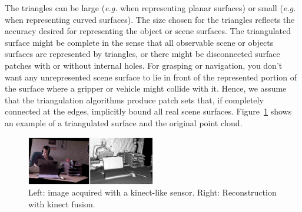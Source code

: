 \documentclass[twocolumn,oneside]{book}
\begin{document}
\begin{itemize}
  The triangles can be large ({\it e.g.} when representing planar
  surfaces) or small ({\it e.g.} when representing curved surfaces).
  The size chosen for the triangles reflects the accuracy desired for
  representing the object or scene surfaces.  The triangulated surface
  might be complete in the sense that all observable scene or objects
  surfaces are represented by triangles, or there might be
  disconnected surface patches with or without internal holes.  For
  grasping or navigation, you don't want any unrepresented scene
  surface to lie in front of the represented portion of the surface
  where a gripper or vehicle might collide with it.  Hence, we assume
  that the triangulation algorithms produce patch sets that, if
  completely connected at the edges, implicitly bound all real scene
  surfaces. Figure~\ref{timmesh} shows an example of a triangulated
  surface and the original point cloud.
\begin{figure}
    \includegraphics[width=0.5\textwidth]{BOOKFIGS/kinect_fusion}
\caption{Left: image acquired with a kinect-like sensor.
  Right: Reconstruction with kinect fusion. \label{timmesh}}
\end{figure}


\end{itemize}
\end{document}

